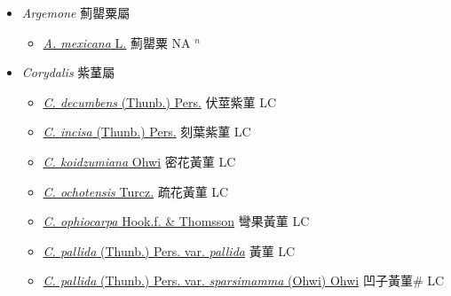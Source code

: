 
  \begin{itemize}
 \item[] \textit{Argemone} 薊罌粟屬
                    
  \begin{itemize}
        \item[] \href{http://www.theplantlist.org/tpl1.1/search?q=Argemone+mexicana}{\textit{A. mexicana} L.}   薊罌粟 NA $^n$
  \end{itemize}
 \item[] \textit{Corydalis} 紫蓳屬
                    
  \begin{itemize}
        \item[] \href{http://www.theplantlist.org/tpl1.1/search?q=Corydalis+decumbens}{\textit{C. decumbens} (Thunb.) Pers.}   伏莖紫菫 LC
        \item[] \href{http://www.theplantlist.org/tpl1.1/search?q=Corydalis+incisa}{\textit{C. incisa} (Thunb.) Pers.}   刻葉紫菫 LC
        \item[] \href{http://www.theplantlist.org/tpl1.1/search?q=Corydalis+koidzumiana}{\textit{C. koidzumiana} Ohwi}   密花黃菫 LC
        \item[] \href{http://www.theplantlist.org/tpl1.1/search?q=Corydalis+ochotensis}{\textit{C. ochotensis} Turcz.}   疏花黃菫 LC
        \item[] \href{http://www.theplantlist.org/tpl1.1/search?q=Corydalis+ophiocarpa}{\textit{C. ophiocarpa} Hook.f. \& Thomsson}   彎果黃菫 LC
        \item[] \href{http://www.theplantlist.org/tpl1.1/search?q=Corydalis+pallida+var.+pallida}{\textit{C. pallida} (Thunb.) Pers. var. \textit{pallida}}   黃菫 LC
        \item[] \href{http://www.theplantlist.org/tpl1.1/search?q=Corydalis+pallida+var.+sparsimamma}{\textit{C. pallida} (Thunb.) Pers. var. \textit{sparsimamma} (Ohwi) Ohwi}   凹子黃菫\# LC

\end{itemize}
\end{itemize}
